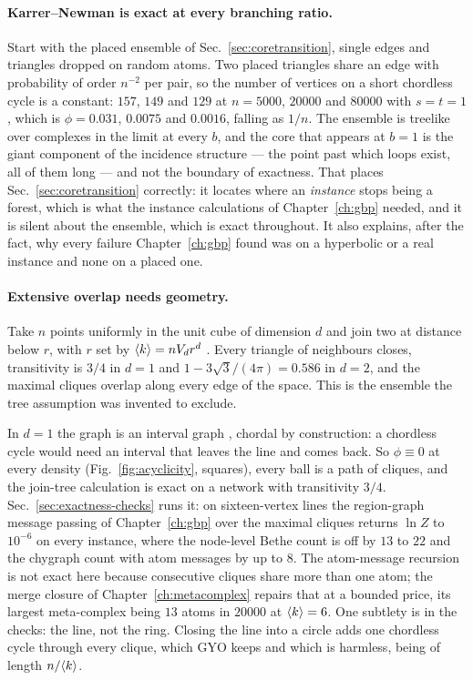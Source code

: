 \paragraph{Karrer--Newman is exact at every branching ratio.} Start with the
placed ensemble of Sec.~\ref{sec:coretransition}, single edges and triangles
dropped on random atoms. Two placed triangles share an edge with probability
of order $n^{-2}$ per pair, so the number of vertices on a short chordless
cycle is a constant: $157$, $149$ and $129$ at $n=5000$, $20000$ and $80000$
with $s=t=1$, which is $\phi=0.031$, $0.0075$ and $0.0016$, falling as $1/n$.
The ensemble is treelike over complexes in the limit at every $b$, and the
core that appears at $b=1$ is the giant component of the incidence structure
--- the point past which loops exist, all of them long --- and not the
boundary of exactness. That places Sec.~\ref{sec:coretransition} correctly:
it locates where an \emph{instance} stops being a forest, which is what the
instance calculations of Chapter~\ref{ch:gbp} needed, and it is silent about
the ensemble, which is exact throughout. It also explains, after the fact, why
every failure Chapter~\ref{ch:gbp} found was on a hyperbolic or a real
instance and none on a placed one.

\paragraph{Extensive overlap needs geometry.} Take $n$ points uniformly in the
unit cube of dimension $d$ and join two at distance below $r$, with
$r$ set by $\langle k \rangle=nV_{d}r^{d}$ \citep{penrose2003}. Every triangle of
neighbours closes, transitivity is $3/4$ in $d=1$ and $1-3\sqrt3/(4\pi)=0.586$
in $d=2$, and the maximal cliques overlap along every edge of the space. This
is the ensemble the tree assumption was invented to exclude.

In $d=1$ the graph is an interval graph \citep{scheinerman1988}, chordal by
construction: a chordless cycle would need an interval that leaves the line
and comes back. So $\phi\equiv0$ at every density (Fig.~\ref{fig:acyclicity},
squares), every ball is a path of cliques, and the join-tree calculation is
exact on a network with transitivity $3/4$. Sec.~\ref{sec:exactness-checks}
runs it: on sixteen-vertex lines the region-graph message passing of
Chapter~\ref{ch:gbp} over the maximal cliques returns $\ln Z$ to $10^{-6}$ on
every instance, where the node-level Bethe count is off by $13$ to $22$ and
the chygraph count with atom messages by up to $8$. The atom-message recursion
is not exact here because consecutive cliques share more than one atom; the
merge closure of Chapter~\ref{ch:metacomplex} repairs that at a bounded price,
its largest meta-complex being $13$ atoms in $20000$ at $\langle k \rangle=6$. One
subtlety is in the checks: the line, not the ring. Closing the line into a
circle adds one chordless cycle through every clique, which GYO keeps and
which is harmless, being of length $n/\langle k \rangle$.

